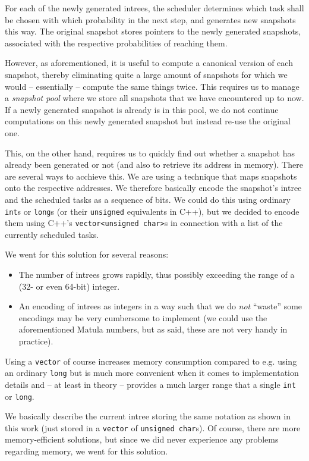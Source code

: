 For each of the newly generated intrees, the scheduler determines which task shall be chosen with which probability in the next step, and generates new snapshots this way. The original snapshot stores pointers to the newly generated snapshots, associated with the respective probabilities of reaching them.

However, as aforementioned, it is useful to compute a canonical version of each snapshot, thereby eliminating quite a large amount of snapshots for which we would -- essentially -- compute the same things twice. This requires us to manage a \emph{snapshot pool} where we store all snapshots that we have encountered up to now. If a newly generated snapshot is already is in this pool, we do not continue computations on this newly generated snapshot but instead re-use the original one.

This, on the other hand, requires us to quickly find out whether a snapshot has already been generated or not (and also to retrieve its address in memory). There are several ways to acchieve this. We are using a technique that maps snapshots onto the respective addresses. We therefore basically encode the snapshot's intree and the scheduled tasks as a sequence of bits. We could do this using ordinary \texttt{int}s or \texttt{long}s (or their \texttt{unsigned} equivalents in C++), but we decided to encode them using C++'s \texttt{vector<unsigned char>}s in connection with a list of the currently scheduled tasks.

We went for this solution for several reasons:

\begin{itemize}
\item The number of intrees grows rapidly, thus possibly exceeding the range of a (32- or even 64-bit) integer.
\item An encoding of intrees as integers in a way such that we do \emph{not} ``waste'' some encodings may be very cumbersome to implement (we could use the aforementioned Matula numbers, but as said, these are not very handy in practice).
\end{itemize}

Using a \texttt{vector} of course increases memory consumption compared to e.g. using an ordinary \texttt{long} but is much more convenient when it comes to implementation details and -- at least in theory -- provides a much larger range that a single \texttt{int} or \texttt{long}.

We basically describe the current intree storing the same notation as shown in this work (just stored in a \texttt{vector} of \texttt{unsigned char}s). Of course, there are more memory-efficient solutions, but since we did never experience any problems regarding memory, we went for this solution.

